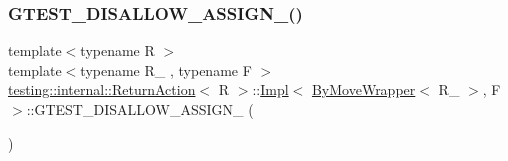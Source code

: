 \subsubsection{\texorpdfstring{GTEST\_DISALLOW\_ASSIGN\_()}{GTEST\_DISALLOW\_ASSIGN\_()}\hspace{0.1cm}{\footnotesize\ttfamily [3/3]}}
{\footnotesize\ttfamily template$<$typename R $>$ \\
template$<$typename R\+\_\+ , typename F $>$ \\
\mbox{\hyperlink{classtesting_1_1internal_1_1_return_action}{testing\+::internal\+::\+Return\+Action}}$<$ R $>$\+::\mbox{\hyperlink{classtesting_1_1internal_1_1_return_action_1_1_impl}{Impl}}$<$ \mbox{\hyperlink{structtesting_1_1internal_1_1_by_move_wrapper}{By\+Move\+Wrapper}}$<$ R\+\_\+ $>$, F $>$\+::G\+T\+E\+S\+T\+\_\+\+D\+I\+S\+A\+L\+L\+O\+W\+\_\+\+A\+S\+S\+I\+G\+N\+\_\+ (\begin{DoxyParamCaption}\item[{\mbox{\hyperlink{classtesting_1_1internal_1_1_return_action_1_1_impl}{Impl}}$<$ \mbox{\hyperlink{structtesting_1_1internal_1_1_by_move_wrapper}{By\+Move\+Wrapper}}$<$ R\+\_\+ $>$, F $>$}]{ }\end{DoxyParamCaption})\hspace{0.3cm}{\ttfamily [private]}}

\mbox{\label{classtesting_1_1internal_1_1_return_action_1_1_impl_3_01_by_move_wrapper_3_01_r___01_4_00_01_f_01_4_ad49336b69584cc6e90515a1540d2510c}} 
